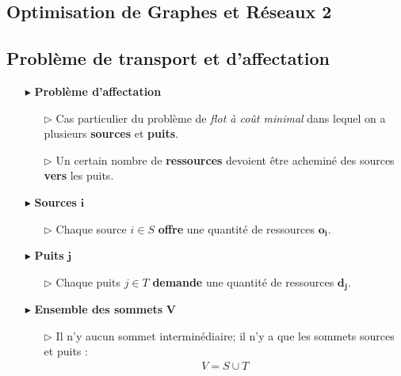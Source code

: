 \documentclass{report}
\begin{document}
\begin{multicols*}{2}
\newpage
\chapter{Optimisation de Graphes et Réseaux 2}
\section{Problème de transport et d'affectation}

\begin{itemize}
    \item [$\blacktriangleright$ ] \textbf{Problème d'affectation}  
        \begin{itemize}
            \item [$\rhd$ ] Cas particulier du problème de 
                \textit{flot à coût minimal} dans lequel on  a plusieurs 
                \textbf{sources} et \textbf{puits}. 
            \item [$\rhd$ ] Un certain nombre de \textbf{ressources} 
                devoient être acheminé des sources \textbf{vers} les puits.   
        \end{itemize}
    \item [$\blacktriangleright$ ] \textbf{Sources} $\boldsymbol{i}$    
        \begin{itemize}
            \item [$\rhd$ ] 
                Chaque source $i \in S$ \textbf{offre} une quantité de ressources 
            $\boldsymbol{o_i}$.   
        \end{itemize}
    \item [$\blacktriangleright$ ] \textbf{Puits} $\boldsymbol{j}$    
        \begin{itemize}
            \item [$\rhd$ ] 
                Chaque puits $j \in T$ \textbf{demande} 
                une quantité de ressources 
            $\boldsymbol{d_j}$.   
        \end{itemize}
    \item [$\blacktriangleright$ ] \textbf{Ensemble des sommets} $\boldsymbol{V}$  
        \begin{itemize}
            \item [$\rhd$ ] 
                Il n'y aucun sommet interminédiaire; il n'y a que les sommets 
                sources et puits :
                \begin{align*}
                    V = S \cup T
                \end{align*}
        \end{itemize}

\end{itemize}
\end{multicols*}
\end{document}
